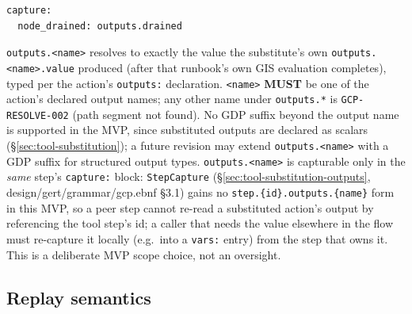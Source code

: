 \begin{verbatim}
capture:
  node_drained: outputs.drained
\end{verbatim}

\texttt{outputs.<name>} resolves to exactly the value the substitute's own
\texttt{outputs.<name>.value} produced (after that runbook's own GIS
evaluation completes), typed per the action's \texttt{outputs:} declaration.
\texttt{<name>} \textbf{MUST} be one of the action's declared output names;
any other name under \texttt{outputs.*} is \texttt{GCP-RESOLVE-002} (path
segment not found). No GDP suffix beyond the output name is supported in the
MVP, since substituted outputs are declared as scalars
(\S\ref{sec:tool-substitution}); a future revision may extend
\texttt{outputs.<name>} with a GDP suffix for structured output types.
\texttt{outputs.<name>} is capturable only in the \emph{same} step's
\texttt{capture:} block: \texttt{StepCapture} (\S\ref{sec:tool-substitution-outputs},
design/gert/grammar/gcp.ebnf \S3.1) gains no \texttt{step.\{id\}.outputs.\{name\}}
form in this MVP, so a peer step cannot re-read a substituted action's
output by referencing the tool step's id; a caller that needs the value
elsewhere in the flow must re-capture it locally (e.g.\ into a \texttt{vars:}
entry) from the step that owns it. This is a deliberate MVP scope choice,
not an oversight.

\subsection{Replay semantics}
\label{sec:tool-substitution-replay}


